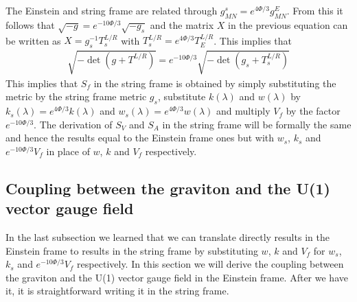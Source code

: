 \documentclass[a4paper,12pt]{article}
\begin{document}
The Einstein and string frame are related through $g^s_{MN} = e^{ 4 \Phi / 3}g^{E}_{MN}$. From this it follows that $\sqrt{-g} = e^{- 10 \Phi / 3} \sqrt{-g_s}$ and the matrix $X$ in the previous equation can be written as $X = g_s^{-1} T^{L/R}_s$ with $T^{L/R}_s = e^{4 \Phi / 3} T^{L/R}_E$. This implies that
\begin{align}
\sqrt{-\det \left( g + T^{L/R} \right)} = e^{- 10 \Phi / 3} \sqrt{-\det \left( g_s + T^{L/R}_s \right)}
\end{align}
This implies that $S_f$ in the string frame is obtained by simply substituting the metric by the string frame metric $g_s$, substitute $k\left(\lambda\right)$ and $w\left(\lambda\right)$ by $k_s \left(\lambda\right) = e^{4 \Phi / 3} k\left(\lambda\right) $ and $w_s \left(\lambda\right) = e^{4 \Phi / 3} w\left(\lambda\right) $ and multiply $V_f$ by the factor $e^{-10 \Phi / 3}$. The derivation of $S_V$ and $S_A$ in the string frame will be formally the same and hence the results equal to the Einstein frame ones but with $w_s$, $k_s$ and $e^{-10 \Phi / 3} V_f$ in place of $w$, $k$ and $V_f$ respectively.

\subsection{Coupling between the graviton and the U(1) vector gauge field}
In the last subsection we learned that we can translate directly results in the Einstein frame to results in the string frame by substituting $w$, $k$ and $V_f$ for $w_s$, $k_s$ and $e^{-10 \Phi / 3} V_f$ respectively. In this section we will derive the coupling between the graviton and the U(1) vector gauge field in the Einstein frame. After we have it, it is straightforward writing it in the string frame.
\end{document}
